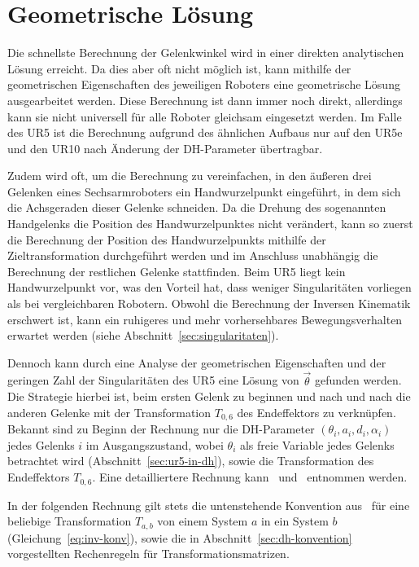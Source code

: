 \section{Geometrische Lösung}\label{sec:geometrische-losung}
Die schnellste Berechnung der Gelenkwinkel wird in einer direkten analytischen Lösung erreicht.
Da dies aber oft nicht möglich ist, kann mithilfe der geometrischen Eigenschaften des jeweiligen Roboters eine geometrische Lösung ausgearbeitet werden.
Diese Berechnung ist dann immer noch direkt, allerdings kann sie nicht universell für alle Roboter gleichsam eingesetzt werden.
Im Falle des UR5 ist die Berechnung aufgrund des ähnlichen Aufbaus nur auf den UR5e und den UR10 nach Änderung der DH-Parameter übertragbar.

Zudem wird oft, um die Berechnung zu vereinfachen, in den äußeren drei Gelenken eines Sechsarmroboters ein Handwurzelpunkt eingeführt, in dem sich die Achsgeraden dieser Gelenke schneiden.
Da die Drehung des sogenannten Handgelenks die Position des Handwurzelpunktes nicht verändert, kann so zuerst die Berechnung der Position des Handwurzelpunkts mithilfe der Zieltransformation durchgeführt werden und im Anschluss unabhängig die Berechnung der restlichen Gelenke stattfinden.
Beim UR5 liegt kein Handwurzelpunkt vor, was den Vorteil hat, dass weniger Singularitäten vorliegen als bei vergleichbaren Robotern.
Obwohl die Berechnung der Inversen Kinematik erschwert ist, kann ein ruhigeres und mehr vorhersehbares Bewegungsverhalten erwartet werden (siehe Abschnitt~\ref{sec:singularitaten}).

Dennoch kann durch eine Analyse der geometrischen Eigenschaften und der geringen Zahl der Singularitäten des UR5 eine Lösung von $\overrightarrow{\theta}$ gefunden werden.
Die Strategie hierbei ist, beim ersten Gelenk zu beginnen und nach und nach die anderen Gelenke mit der Transformation $T_{0,6}$ des Endeffektors zu verknüpfen.
Bekannt sind zu Beginn der Rechnung nur die DH-Parameter $(\theta_i, a_i, d_i, \alpha_i)$ jedes Gelenks $i$ im Ausgangszustand, wobei $\theta_i$ als freie Variable jedes Gelenks betrachtet wird (Abschnitt~\ref{sec:ur5-in-dh}), sowie die Transformation des Endeffektors $T_{0,6}$.
Eine detailliertere Rechnung kann~\cite{rasmusandersenKinematicsUR52018} und~\cite{hawkinsAnalyticInverseKinematics2013} entnommen werden.

In der folgenden Rechnung gilt stets die untenstehende Konvention aus~\cite[82]{craigIntroductionRoboticsMechanics2009} für eine beliebige Transformation $T_{a,b}$ von einem System $a$ in ein System $b$ (Gleichung~\ref{eq:inv-konv}), sowie die in Abschnitt~\ref{sec:dh-konvention} vorgestellten Rechenregeln für Transformationsmatrizen.

